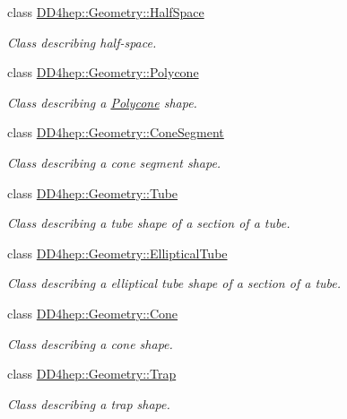 \begin{DoxyCompactItemize}
class \hyperlink{class_d_d4hep_1_1_geometry_1_1_half_space}{DD4hep::Geometry::HalfSpace}
\begin{DoxyCompactList}\small\item\em Class describing half-\/space. \item\end{DoxyCompactList}\item 
class \hyperlink{class_d_d4hep_1_1_geometry_1_1_polycone}{DD4hep::Geometry::Polycone}
\begin{DoxyCompactList}\small\item\em Class describing a \hyperlink{class_d_d4hep_1_1_geometry_1_1_polycone}{Polycone} shape. \item\end{DoxyCompactList}\item 
class \hyperlink{class_d_d4hep_1_1_geometry_1_1_cone_segment}{DD4hep::Geometry::ConeSegment}
\begin{DoxyCompactList}\small\item\em Class describing a cone segment shape. \item\end{DoxyCompactList}\item 
class \hyperlink{class_d_d4hep_1_1_geometry_1_1_tube}{DD4hep::Geometry::Tube}
\begin{DoxyCompactList}\small\item\em Class describing a tube shape of a section of a tube. \item\end{DoxyCompactList}\item 
class \hyperlink{class_d_d4hep_1_1_geometry_1_1_elliptical_tube}{DD4hep::Geometry::EllipticalTube}
\begin{DoxyCompactList}\small\item\em Class describing a elliptical tube shape of a section of a tube. \item\end{DoxyCompactList}\item 
class \hyperlink{class_d_d4hep_1_1_geometry_1_1_cone}{DD4hep::Geometry::Cone}
\begin{DoxyCompactList}\small\item\em Class describing a cone shape. \item\end{DoxyCompactList}\item 
class \hyperlink{class_d_d4hep_1_1_geometry_1_1_trap}{DD4hep::Geometry::Trap}
\begin{DoxyCompactList}\small\item\em Class describing a trap shape. \item\end{DoxyCompactList}\item 

\end{DoxyCompactItemize}
